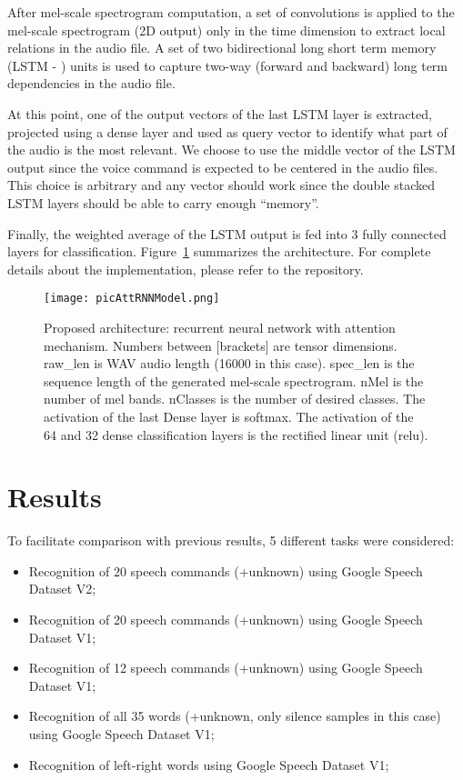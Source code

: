 \documentclass[authoryear, review, 12pt, 3p]{elsarticle}
\begin{document}
After mel-scale spectrogram computation, a set of convolutions is applied to the mel-scale spectrogram (2D output) only in the time dimension to extract local relations in the audio file. A set of two bidirectional long short term memory (LSTM - \cite{Hochreiter:1997:LSM:1246443.1246450}) units is used to capture two-way (forward and backward) long term dependencies in the audio file.

At this point, one of the output vectors of the last LSTM layer is extracted, projected using a dense layer and used as query vector to identify what part of the audio is the most relevant. We choose to use the middle vector of the LSTM output since the voice command is expected to be centered in the audio files. This choice is arbitrary and any vector should work since the double stacked LSTM layers should be able to carry enough ``memory''.

Finally, the weighted average of the LSTM output is fed into 3 fully connected layers for classification. Figure~\ref{figAttRNN} summarizes the architecture. For complete details about the implementation, please refer to the repository.

\begin{figure}[!ht]
\centering
\texttt{[image: picAttRNNModel.png]}
\caption{Proposed architecture: recurrent neural network with attention mechanism. Numbers between [brackets] are tensor dimensions. raw\_len is WAV audio length (16000 in this case). spec\_len is the sequence length of the generated mel-scale spectrogram. nMel is the number of mel bands. nClasses is the number of desired classes. The activation of the last Dense layer is softmax. The activation of the 64 and 32 dense classification layers is the rectified linear unit (relu).}
\label{figAttRNN}
\end{figure}


\section{Results}
\label{secRes}

To facilitate comparison with previous results, 5 different tasks were considered:

\begin{itemize}
    \item Recognition of 20 speech commands (+unknown) using Google Speech Dataset V2;
    \item Recognition of 20 speech commands (+unknown) using Google Speech Dataset V1;
    \item Recognition of 12 speech commands (+unknown) using Google Speech Dataset V1;
    \item Recognition of all 35 words (+unknown, only silence samples in this case) using Google Speech Dataset V1;
    \item Recognition of left-right words using Google Speech Dataset V1;
\end{itemize}
\end{document}
